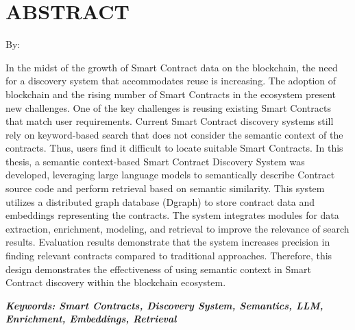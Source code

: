 \clearpage
\chapter*{ABSTRACT}

\begin{center}
	\center
	\begin{singlespace}
		\large\bfseries\MakeUppercase{\thetitle}

		\normalfont\normalsize
		By:

		\bfseries \theauthor
	\end{singlespace}
\end{center}

\begin{singlespace}
	\small

    In the midst of the growth of Smart Contract data on the blockchain, the need for a discovery system that accommodates reuse is increasing. The adoption of blockchain and the rising number of Smart Contracts in the ecosystem present new challenges. One of the key challenges is reusing existing Smart Contracts that match user requirements. Current Smart Contract discovery systems still rely on keyword-based search that does not consider the semantic context of the contracts. Thus, users find it difficult to locate suitable Smart Contracts. In this thesis, a semantic context-based Smart Contract Discovery System was developed, leveraging large language models to semantically describe Contract source code and perform retrieval based on semantic similarity. This system utilizes a distributed graph database (Dgraph) to store contract data and embeddings representing the contracts. The system integrates modules for data extraction, enrichment, modeling, and retrieval to improve the relevance of search results. Evaluation results demonstrate that the system increases precision in finding relevant contracts compared to traditional approaches. Therefore, this design demonstrates the effectiveness of using semantic context in Smart Contract discovery within the blockchain ecosystem.

	\textbf{\textit{Keywords: Smart Contracts, Discovery System, Semantics, LLM, Enrichment, Embeddings, Retrieval}}
\end{singlespace}
\clearpage

\clearpage